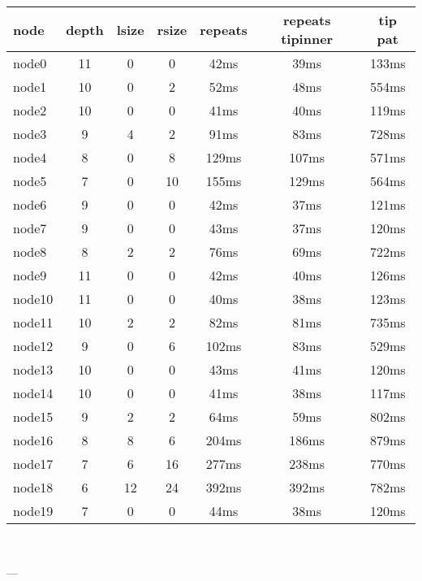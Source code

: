

\begin{tabular}{|l|c|c|c|c|c|c|}
\hline node & depth & lsize & rsize  & repeats & repeats tipinner & tip pat\\
    \hline node0 & 11 & 0 & 0 & 42ms & 39ms & 133ms\\
    \hline node1 & 10 & 0 & 2 & 52ms & 48ms & 554ms\\
    \hline node2 & 10 & 0 & 0 & 41ms & 40ms & 119ms\\
    \hline node3 & 9 & 4 & 2 & 91ms & 83ms & 728ms\\
    \hline node4 & 8 & 0 & 8 & 129ms & 107ms & 571ms\\
    \hline node5 & 7 & 0 & 10 & 155ms & 129ms & 564ms\\
    \hline node6 & 9 & 0 & 0 & 42ms & 37ms & 121ms\\
    \hline node7 & 9 & 0 & 0 & 43ms & 37ms & 120ms\\
    \hline node8 & 8 & 2 & 2 & 76ms & 69ms & 722ms\\
    \hline node9 & 11 & 0 & 0 & 42ms & 40ms & 126ms\\
    \hline node10 & 11 & 0 & 0 & 40ms & 38ms & 123ms\\
    \hline node11 & 10 & 2 & 2 & 82ms & 81ms & 735ms\\
    \hline node12 & 9 & 0 & 6 & 102ms & 83ms & 529ms\\
    \hline node13 & 10 & 0 & 0 & 43ms & 41ms & 120ms\\
    \hline node14 & 10 & 0 & 0 & 41ms & 38ms & 117ms\\
    \hline node15 & 9 & 2 & 2 & 64ms & 59ms & 802ms\\
    \hline node16 & 8 & 8 & 6 & 204ms & 186ms & 879ms\\
    \hline node17 & 7 & 6 & 16 & 277ms & 238ms & 770ms\\
    \hline node18 & 6 & 12 & 24 & 392ms & 392ms & 782ms\\
    \hline node19 & 7 & 0 & 0 & 44ms & 38ms & 120ms\\

\hline
\end{tabular} \

---


